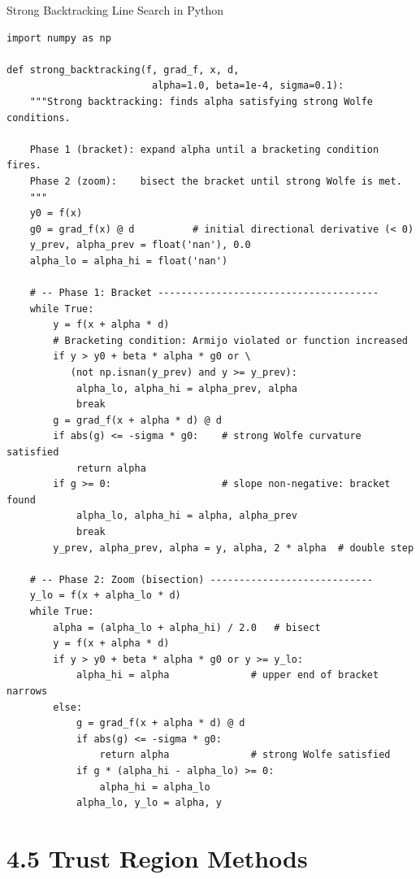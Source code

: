 \documentclass[aspectratio=169,10pt]{beamer}
\begin{document}
\begin{frame}[fragile]{Strong Backtracking Line Search in Python}

\begin{lstlisting}[style=pycode]
import numpy as np

def strong_backtracking(f, grad_f, x, d,
                         alpha=1.0, beta=1e-4, sigma=0.1):
    """Strong backtracking: finds alpha satisfying strong Wolfe conditions.

    Phase 1 (bracket): expand alpha until a bracketing condition fires.
    Phase 2 (zoom):    bisect the bracket until strong Wolfe is met.
    """
    y0 = f(x)
    g0 = grad_f(x) @ d          # initial directional derivative (< 0)
    y_prev, alpha_prev = float('nan'), 0.0
    alpha_lo = alpha_hi = float('nan')

    # -- Phase 1: Bracket --------------------------------------
    while True:
        y = f(x + alpha * d)
        # Bracketing condition: Armijo violated or function increased
        if y > y0 + beta * alpha * g0 or \
           (not np.isnan(y_prev) and y >= y_prev):
            alpha_lo, alpha_hi = alpha_prev, alpha
            break
        g = grad_f(x + alpha * d) @ d
        if abs(g) <= -sigma * g0:    # strong Wolfe curvature satisfied
            return alpha
        if g >= 0:                   # slope non-negative: bracket found
            alpha_lo, alpha_hi = alpha, alpha_prev
            break
        y_prev, alpha_prev, alpha = y, alpha, 2 * alpha  # double step

    # -- Phase 2: Zoom (bisection) ----------------------------
    y_lo = f(x + alpha_lo * d)
    while True:
        alpha = (alpha_lo + alpha_hi) / 2.0   # bisect
        y = f(x + alpha * d)
        if y > y0 + beta * alpha * g0 or y >= y_lo:
            alpha_hi = alpha              # upper end of bracket narrows
        else:
            g = grad_f(x + alpha * d) @ d
            if abs(g) <= -sigma * g0:
                return alpha              # strong Wolfe satisfied
            if g * (alpha_hi - alpha_lo) >= 0:
                alpha_hi = alpha_lo
            alpha_lo, y_lo = alpha, y
\end{lstlisting}

\end{frame}

\section{4.5 Trust Region Methods}
\end{document}
